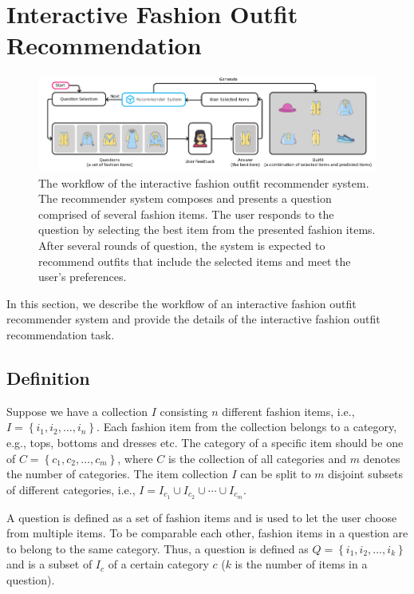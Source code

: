\chapter{Interactive Fashion Outfit Recommendation}
\label{sq:task}

\begin{figure}[t]
  \centering
  \includegraphics[width=\linewidth]{figures/workflow.pdf}
  \caption{The workflow of the interactive fashion outfit recommender system. 
  The recommender system composes and presents a question comprised of several fashion items.
The user responds to the question by selecting the best item from the presented fashion items.
After several rounds of question, the system is expected to recommend outfits 
that include the selected items and meet the user's preferences.}
  \label{workflow}
\end{figure}


In this section, we describe the workflow of an interactive fashion outfit recommender system 
and provide the details of the interactive fashion outfit recommendation task.

\section{Definition}

Suppose we have a collection $I$ consisting $n$ different fashion items, i.e., $I = \left\{i_1, i_2, \ldots, i_n \right\}$. 
Each fashion item from the collection belongs to a category, e.g., tops, bottoms and dresses etc. 
The category of a specific item should be one of $C = \left\{c_1, c_2, \ldots, c_m\right\}$, where $C$ is the collection of all categories and $m$ denotes the number of categories. 
The item collection $I$ can be split to $m$ disjoint subsets of different categories, 
i.e., $I = I_{c_1} \cup I_{c_2} \cup \cdots \cup I_{c_m}$.

A question is defined as a set of fashion items and is used to let the user choose from multiple items.
To be comparable each other, fashion items in a question are to belong to the same category.
Thus, a question is defined as $Q = \left\{ i_1, i_2, \ldots, i_k \right\}$ 
and is a subset of $I_c$ of a certain category $c$ ($k$ is the number of items in a question). 

